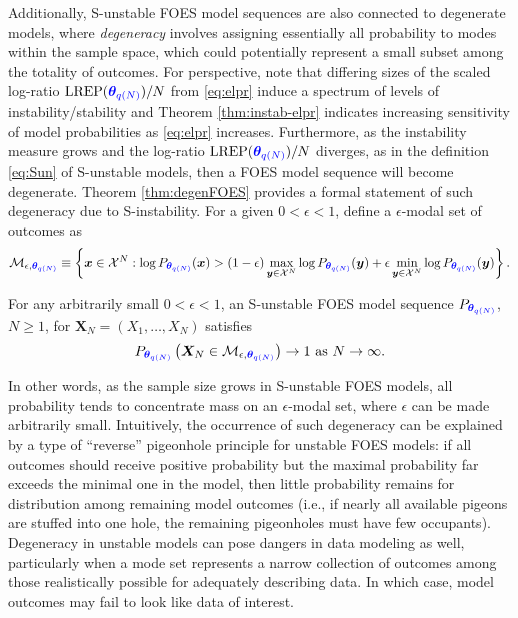 \documentclass[numbib]{imamat}
\theoremstyle{theorem}
\theoremstyle{lemma}
\theoremstyle{example}
\theoremstyle{corollary}
\theoremstyle{definition}
\theoremstyle{remark}
\theoremstyle{approximation}
\theoremstyle{scheme}
\newcommand{\REP}{\mathrm{LREP}}
\newcommand{\thetaidx}{q(N)}
\newcommand{\thetaN}{\boldsymbol \theta_{\thetaidx}}
\newcommand{\ak}[1]{{\color{blue} #1}}
\let\BeginKnitrBlock\begin \let\EndKnitrBlock\end
\begin{document}
Additionally, S-unstable FOES model sequences are also connected to degenerate models, where \emph{degeneracy} involves assigning essentially all probability to modes within the sample space, which could potentially represent a small subset among the totality of outcomes. For perspective, note that differing sizes of the scaled log-ratio \(\REP(\ak{\thetaN})/N\) from \eqref{eq:elpr} induce a spectrum of levels of instability/stability and Theorem \ref{thm:instab-elpr} indicates increasing sensitivity of model probabilities as \eqref{eq:elpr} increases. Furthermore, as the instability measure grows and the log-ratio \(\REP(\ak{\thetaN})/N\) diverges, as in the definition \eqref{eq:Sun} of S-unstable models, then a FOES model sequence will become degenerate. Theorem \ref{thm:degenFOES} provides a formal statement of such degeneracy due to S-instability. For a given \(0 < \epsilon < 1\), define a \(\epsilon\)-modal set of outcomes as
\begin{equation}
\label{eq:mode}
\mathcal{M}_{\epsilon, \ak{\thetaN}} \equiv \left\{\boldsymbol x \in \mathcal{X}^N: \log P_{\ak{\thetaN}}(\boldsymbol x) > (1-\epsilon)\max\limits_{\boldsymbol y \in \mathcal{X}^N} \log  P_{\ak{\thetaN}}(\boldsymbol y) + \epsilon\min\limits_{\boldsymbol y \in \mathcal{X}^N} \log P_{\ak{\thetaN}}(\boldsymbol y) \right\}.
\end{equation}
\BeginKnitrBlock{theorem}
\protect\hypertarget{thm:degenFOES}{}{\label{thm:degenFOES} }For any arbitrarily small \(0 < \epsilon < 1\), an S-unstable FOES model sequence \(P_{\ak{\thetaN}}\), \(N \geq 1\), for \(\boldsymbol X_N=(X_1, \dots, X_N)\) satisfies
\[
P_{\ak{\thetaN}}\left( \boldsymbol X_N\in \mathcal{M}_{\epsilon, \ak{\thetaN}}\right) \rightarrow 1 \text{ as } N \rightarrow \infty.
\]
\EndKnitrBlock{theorem}

In other words, as the sample size grows in S-unstable FOES models, all probability tends to concentrate mass on an \(\epsilon\)-modal set, where \(\epsilon\) can be made arbitrarily small. Intuitively, the occurrence of such degeneracy can be explained by a type of ``reverse'' pigeonhole principle for unstable FOES models: if all outcomes should receive positive probability but the maximal probability far exceeds the minimal one in the model, then little probability remains for distribution among remaining model outcomes (i.e., if nearly all available pigeons are stuffed into one hole, the remaining pigeonholes must have few occupants). Degeneracy in unstable models can pose dangers in data modeling as well, particularly when a mode set represents a narrow collection of outcomes among those realistically possible for adequately describing data. In which case, model outcomes may fail to look like data of interest.
\end{document}

